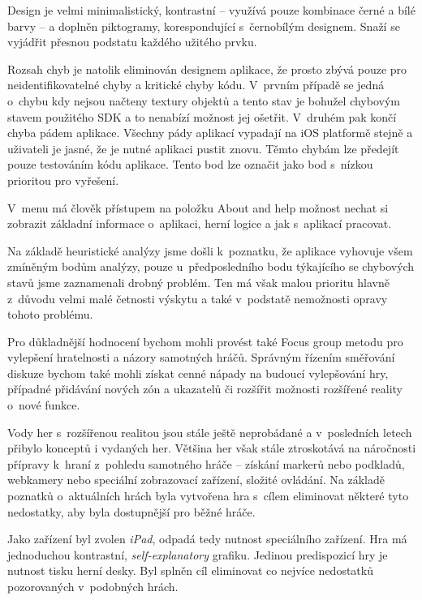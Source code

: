 \documentclass[twoside,12pt]{article}
\begin{document}
Design je velmi minimalistický, kontrastní -- využívá pouze kombinace černé a bílé barvy -- a doplněn piktogramy, korespondující s~černobílým designem. Snaží se vyjádřit přesnou podstatu každého užitého prvku.

Rozsah chyb je natolik eliminován designem aplikace, že prosto zbývá pouze pro neidentifikovatelné chyby a kritické chyby kódu. V~prvním případě se jedná o~chybu kdy nejsou načteny textury objektů a tento stav je bohužel chybovým stavem použitého SDK a to nenabízí možnost jej ošetřit. V~druhém pak končí chyba pádem aplikace. Všechny pády aplikací vypadají na iOS platformě stejně a uživateli je jasné, že je nutné aplikaci pustit znovu. Těmto chybám lze předejít pouze testováním kódu aplikace. Tento bod lze označit jako bod s~nízkou prioritou pro vyřešení.

V~menu má člověk přístupem na položku About and help možnost nechat si zobrazit základní informace o~aplikaci, herní logice a jak s~aplikací pracovat.

Na základě heuristické analýzy jsme došli k~poznatku, že aplikace vyhovuje všem zmíněným bodům analýzy, pouze u~předposledního bodu týkajícího se chybových stavů jsme zaznamenali drobný problém. Ten má však malou prioritu hlavně z~důvodu velmi malé četnosti výskytu a také v~podstatě nemožnosti opravy tohoto problému. 

Pro důkladnější hodnocení bychom mohli provést také Focus group metodu pro vylepšení hratelnosti a názory samotných hráčů. Správným řízením směřování diskuze bychom také mohli získat cenné nápady na budoucí vylepšování hry, případné přidávání nových zón a ukazatelů či rozšířit možnosti rozšířené reality o~nové funkce. 

% 
\newpage

%
%

Vody her s~rozšířenou realitou jsou stále ještě neprobádané a v~posledních letech přibylo konceptů i vydaných her. Většina her však stále ztroskotává na náročnosti přípravy k~hraní z~pohledu samotného hráče -- získání markerů nebo podkladů, webkamery nebo speciální zobrazovací zařízení, složité ovládání. Na základě poznatků o~aktuálních hrách byla vytvořena hra s~cílem eliminovat některé tyto nedostatky, aby byla dostupnější pro běžné hráče. 

Jako zařízení byl zvolen \textit{iPad}, odpadá tedy nutnost speciálního zařízení. Hra má jednoduchou kontrastní, \textit{self-explanatory} grafiku. Jedinou predispozicí hry je nutnost tisku herní desky. Byl splněn cíl eliminovat co nejvíce nedostatků pozorovaných v~podobných hrách.
\end{document}
